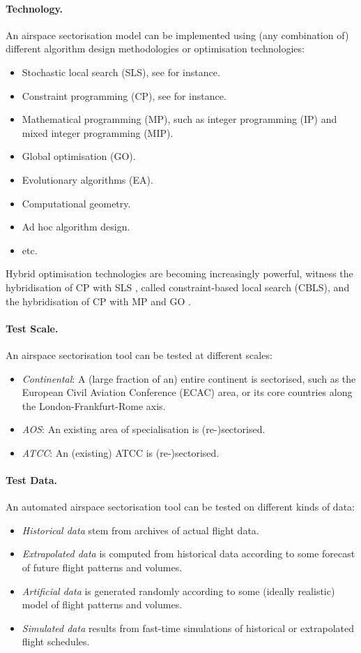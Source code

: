 \documentclass[a4paper,12pt]{article}
\begin{document}
\paragraph{Technology.}
An airspace sectorisation model can be implemented using (any
combination of) different algorithm design methodologies or
optimisation technologies:
\begin{itemize}
\item Stochastic local search (SLS), see \cite{Hoos:SLS} for instance.
\item Constraint programming (CP), see \cite{constraintshandbook} for
  instance.
\item Mathematical programming (MP), such as integer programming (IP)
  and mixed integer programming (MIP).
\item Global optimisation (GO).
\item Evolutionary algorithms (EA).
\item Computational geometry.
\item Ad hoc algorithm design.
\item etc.
\end{itemize}
Hybrid optimisation technologies are becoming increasingly powerful,
witness the hybridisation of CP with SLS \cite{Comet}, called
constraint-based local search (CBLS), and the hybridisation of CP with
MP and GO \cite{Hooker:integrated}.

\paragraph{Test Scale.}
An airspace sectorisation tool can be tested at different scales:
\begin{itemize}
\item \emph{Continental}: A (large fraction of an) entire continent is
  sectorised, such as the European Civil Aviation Conference (ECAC)
  area, or its core countries along the London-Frankfurt-Rome axis.
\item \emph{AOS}: An existing area of specialisation is (re-)sectorised.
\item \emph{ATCC}: An (existing) ATCC is (re-)sectorised.
\end{itemize}

\paragraph{Test Data.}
An automated airspace sectorisation tool can be tested on different
kinds of data:
\begin{itemize}
\item \emph{Historical data} stem from archives of actual flight data.
\item \emph{Extrapolated data} is computed from historical data
  according to some forecast of future flight patterns and volumes.
\item \emph{Artificial data} is generated randomly according to some
  (ideally realistic) model of flight patterns and volumes.
\item \emph{Simulated data} results from fast-time simulations of
  historical or extrapolated flight schedules.
\end{itemize}
\end{document}
